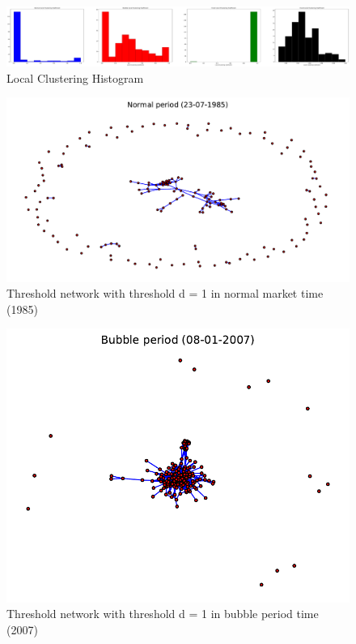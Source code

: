 \documentclass[sigchi]{acmart}
\begin{document}
\begin{figure}[H]
	\centering
	\includegraphics[width=\linewidth]{local_clustering_coefficient.pdf}
	\caption{Local Clustering Histogram}
\end{figure}
\begin{figure}[H]
	\centering
	\includegraphics[width=\linewidth]{(1)tresh_normal.pdf}
	\caption{Threshold network with threshold d = 1 in normal market time (1985)}
\end{figure}
\begin{figure}[H]
	\centering
	\includegraphics[width=\linewidth]{(2)tresh_bubble.pdf}
	\caption{Threshold network with threshold d = 1 in bubble period time (2007)}
\end{figure}
\end{document}
